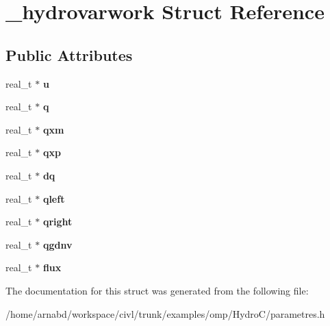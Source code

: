 \hypertarget{struct__hydrovarwork}{}\section{\+\_\+hydrovarwork Struct Reference}
\label{struct__hydrovarwork}
\subsection*{Public Attributes}
\begin{DoxyCompactItemize}
\item 
\hypertarget{struct__hydrovarwork_aaf4e0d5deee141c15573074d15dd4feb}{}real\+\_\+t $\ast$ {\bfseries u}\label{struct__hydrovarwork_aaf4e0d5deee141c15573074d15dd4feb}

\item 
\hypertarget{struct__hydrovarwork_a57b2e4510f6fa976ee8c740d37ca1edb}{}real\+\_\+t $\ast$ {\bfseries q}\label{struct__hydrovarwork_a57b2e4510f6fa976ee8c740d37ca1edb}

\item 
\hypertarget{struct__hydrovarwork_a820d45d3cd77da660ef1430dd4b32d9d}{}real\+\_\+t $\ast$ {\bfseries qxm}\label{struct__hydrovarwork_a820d45d3cd77da660ef1430dd4b32d9d}

\item 
\hypertarget{struct__hydrovarwork_aa9857c3c3cf8f0bf4cf32aa7f951cbcd}{}real\+\_\+t $\ast$ {\bfseries qxp}\label{struct__hydrovarwork_aa9857c3c3cf8f0bf4cf32aa7f951cbcd}

\item 
\hypertarget{struct__hydrovarwork_ac69251c90240e105f9c4c7f7458ce47e}{}real\+\_\+t $\ast$ {\bfseries dq}\label{struct__hydrovarwork_ac69251c90240e105f9c4c7f7458ce47e}

\item 
\hypertarget{struct__hydrovarwork_a025f0d958682e483652bc32bace770b8}{}real\+\_\+t $\ast$ {\bfseries qleft}\label{struct__hydrovarwork_a025f0d958682e483652bc32bace770b8}

\item 
\hypertarget{struct__hydrovarwork_a0beb02e65b152294219c61de807c162e}{}real\+\_\+t $\ast$ {\bfseries qright}\label{struct__hydrovarwork_a0beb02e65b152294219c61de807c162e}

\item 
\hypertarget{struct__hydrovarwork_ab85afd2a3b27706aeebab44ced2891c2}{}real\+\_\+t $\ast$ {\bfseries qgdnv}\label{struct__hydrovarwork_ab85afd2a3b27706aeebab44ced2891c2}

\item 
\hypertarget{struct__hydrovarwork_a794e8d6ade2bdde366acaf1f05c7fc18}{}real\+\_\+t $\ast$ {\bfseries flux}\label{struct__hydrovarwork_a794e8d6ade2bdde366acaf1f05c7fc18}

\end{DoxyCompactItemize}


The documentation for this struct was generated from the following file\+:\begin{DoxyCompactItemize}
\item 
/home/arnabd/workspace/civl/trunk/examples/omp/\+Hydro\+C/parametres.\+h\end{DoxyCompactItemize}
